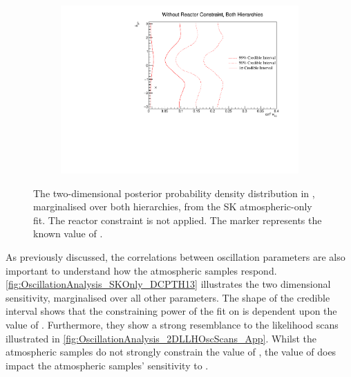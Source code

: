 \begin{figure}[h]
  \begin{subfigure}[t]{0.98\textwidth}
    \includegraphics[width=\textwidth, trim={0mm 0mm 0mm 0mm}, clip,page=1]{Figures/OA/SKOnlyFit/Contours_2D_th13_dcp_BH_0_woRC_UnSmeared_CredibleInterval.pdf}
  \end{subfigure}
  \caption{The two-dimensional posterior probability density distribution in , marginalised over both hierarchies, from the SK atmospheric-only fit. The reactor constraint is not applied. The marker represents the known value of .}
  \label{fig:OscillationAnalysis_SKOnly_DCPTH13}
\end{figure}

As previously discussed, the correlations between oscillation parameters are also important to understand how the atmospheric samples respond. \autoref{fig:OscillationAnalysis_SKOnly_DCPTH13} illustrates the two dimensional  sensitivity, marginalised over all other parameters.
The shape of the \quickmath{1\sigma} credible interval shows that the constraining power of the fit on  is dependent upon the value of . Furthermore, they show a strong resemblance to the likelihood scans illustrated in \autoref{fig:OscillationAnalysis_2DLLHOscScans_App}. Whilst the atmospheric samples do not strongly constrain the value of , the value of  does impact the atmospheric samples' sensitivity to .

